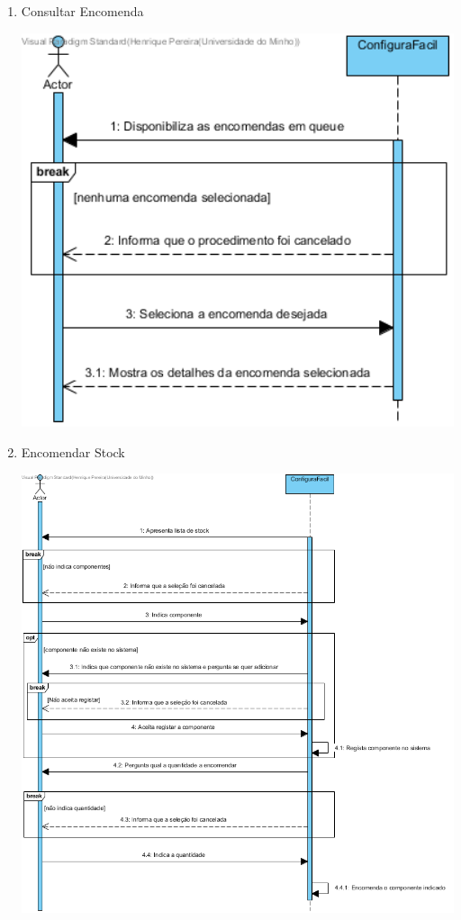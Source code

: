 \documentclass[11pt]{article} %
\begin{document}
\begin{enumerate}
\begin{center}
		\end{center}
	\item Consultar Encomenda
		\begin{center}
 			\includegraphics[width = 6in]{dss_consultar_encomenda.png}
		\end{center}
	\item Encomendar Stock
		\begin{center}
 			\includegraphics[width = 6in]{dss_encomendar_stock.png}

\end{center}
\end{enumerate}
\end{document}
